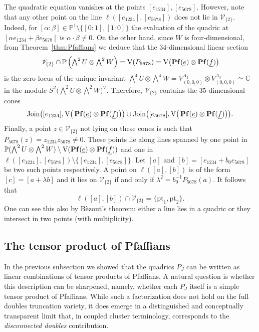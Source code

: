 \documentclass[11pt,reqno]{amsart}
\theoremstyle{definition}
\numberwithin{theorem}{section}
\newcommand{\join}{\text{Join}}
\DeclareMathOperator{\Pf}{\bf Pf}
\numberwithin{equation}{section}
\begin{document}
\indent The quadratic equation vanishes at the points $[e_{1234}] , [e_{5678}]$. However, note that any other point on the line $\ell([e_{1234}],[e_{5678}])$ does not lie in $\mathscr{V}_{\{2\}}$. Indeed, for $[\alpha:\beta]\in \mathbb P^1\setminus \{[0:1],[1:0]\}$ the evaluation of the quadric at $[\alpha e_{1234} + \beta e_{5678}]$ is $\alpha\cdot \beta \neq 0$. On the other hand, since $W$ is four-dimensional, from Theorem~\ref{thm:Pfaffians} we deduce that the $34$-dimensional linear section
\[ \mathscr{V}_{\{2\}}\cap \mathbb P\left(\textstyle{\bigwedge^2U \otimes \bigwedge^2W}\right) = \text{V}( P_{5678} ) = \text{V}\!\left(\Pf(\underline{e})\otimes \Pf(\underline{f}) \right) \]
is the zero locus of the unique invariant $\bigwedge^4U\otimes \bigwedge^4W = V_{(0,0,0)}^{A_3}\otimes V_{(0,0,0)}^{A_3}\simeq \mathbb C$ in the module $S^2\big( \bigwedge^2U \otimes \bigwedge^2W \big)^\vee$. Therefore, $\mathscr{V}_{\{2\}}$ contains the $35$-dimensional cones 
\[ \join\big([e_{1234}] , \text{V}\big( \Pf(\underline{e})\otimes \Pf(\underline{f})\big) \big) \cup \join\big([e_{5678}] , \text{V}\big( \Pf(\underline{e})\otimes \Pf(\underline{f})\big) \big) .\]
Finally, a point $z \in \mathscr{V}_{\{2\}}$ not lying on these cones is such that $P_{5678}(z) = z_{1234}z_{5678} \neq 0$. These points lie along lines spanned by one point in $\mathbb P(\bigwedge^2U\otimes \bigwedge^2W)\setminus \text{V}(\Pf(\underline{e})\otimes \Pf(\underline{f}))$ and one in $\ell([e_{1234}],[e_{5678}])\setminus \{[e_{1234}],[e_{5678}]\}$. Let $[a]$ and $[b]=[e_{1234} + b_0e_{5678}]$ be two such points respectively. A point on $\ell([a],[b])$ is of the form $[c]=[a+\lambda b]$ and it lies on $\mathscr{V}_{\{2\}}$ if and only if $\lambda^2 = b_0^{-1}P_{5678}(a)$. It follows that 
\[ \ell([a],[b]) \cap \mathscr{V}_{\{2\}} = \{ \text{pt}_1, \text{pt}_2\} .\]
One can see this also by Bèzout's theorem: either a line lies in a quadric or they intersect in two points (with multiplicity). 

\subsection{The tensor product of Pfaffians}\label{subsec:disconnected}

In the previous subsection we showed that the quadrics $P_J$ can be written as linear combinations of tensor products of Pfaffians. A natural question is whether this description can be sharpened, namely, whether each $P_J$ itself is a simple tensor product of Pfaffians. While such a factorization does not hold on the full doubles truncation variety, it does emerge in a distinguished and conceptually transparent limit that, in coupled cluster terminology, corresponds to the \emph{disconnected doubles} contribution. 
\end{document}

